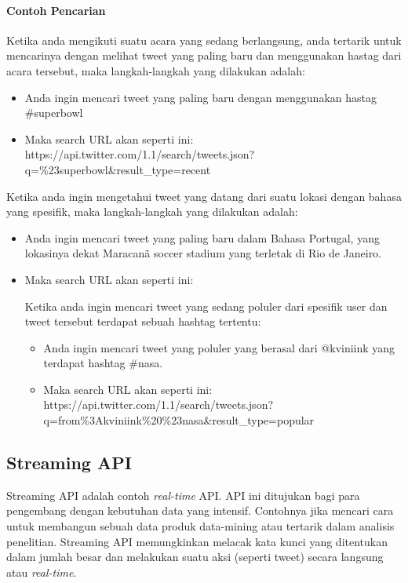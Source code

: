 \paragraph{Contoh Pencarian}
Ketika anda mengikuti suatu acara yang sedang berlangsung, anda tertarik untuk mencarinya dengan melihat tweet yang paling baru dan menggunakan hastag dari acara tersebut, maka langkah-langkah yang dilakukan adalah:
\begin{itemize}
	\item Anda ingin mencari tweet yang paling baru dengan menggunakan hastag \#superbowl
	\item Maka search URL akan seperti ini:
	https://api.twitter.com/1.1/search/tweets.json?q=\%23superbowl\&result\_type=recent
\end{itemize}

Ketika anda ingin mengetahui tweet yang datang dari suatu lokasi dengan bahasa yang spesifik, maka langkah-langkah yang dilakukan adalah:
\begin{itemize}
	\item Anda ingin mencari tweet yang paling baru dalam Bahasa Portugal, yang lokasinya dekat Maracanã soccer stadium yang terletak di Rio de Janeiro.
	\item Maka search URL akan seperti ini:
	
Ketika anda ingin mencari tweet yang sedang poluler dari spesifik user dan tweet tersebut terdapat sebuah hashtag tertentu:
\begin{itemize}
	\item Anda ingin mencari tweet yang poluler yang berasal dari @kviniink yang terdapat hashtag \#nasa.
	\item Maka search URL akan seperti ini:
	https://api.twitter.com/1.1/search/tweets.json?q=from\%3Akviniink\%20\%23nasa\&result\_type=popular
\end{itemize}
\end{itemize}

\subsection{Streaming API}
Streaming API adalah contoh \textit{real-time} API. API ini ditujukan bagi para pengembang dengan kebutuhan data yang intensif. Contohnya jika mencari cara untuk membangun sebuah data produk data-mining atau tertarik dalam analisis penelitian. Streaming API memungkinkan melacak kata kunci yang ditentukan dalam jumlah besar dan melakukan suatu aksi (seperti tweet) secara langsung atau \textit{real-time}.

